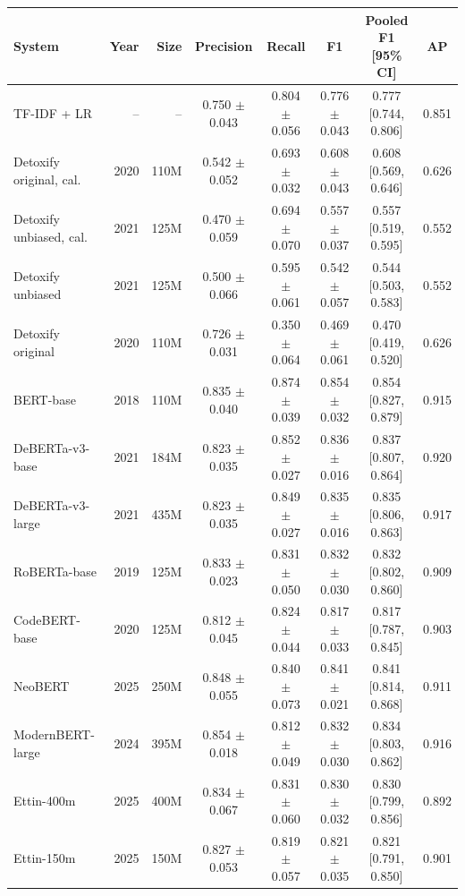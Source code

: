 \begin{tabular}{lrrccccc}
\toprule
System & Year & Size & Precision & Recall & F1 & Pooled F1 [95\% CI] & AP \\
\midrule
TF-IDF + LR & -- & -- & 0.750 $\pm$ 0.043 & 0.804 $\pm$ 0.056 & 0.776 $\pm$ 0.043 & 0.777 [0.744, 0.806] & 0.851 \\
\midrule
Detoxify original, cal. & 2020 & 110M & 0.542 $\pm$ 0.052 & 0.693 $\pm$ 0.032 & 0.608 $\pm$ 0.043 & 0.608 [0.569, 0.646] & 0.626 \\
Detoxify unbiased, cal. & 2021 & 125M & 0.470 $\pm$ 0.059 & 0.694 $\pm$ 0.070 & 0.557 $\pm$ 0.037 & 0.557 [0.519, 0.595] & 0.552 \\
Detoxify unbiased & 2021 & 125M & 0.500 $\pm$ 0.066 & 0.595 $\pm$ 0.061 & 0.542 $\pm$ 0.057 & 0.544 [0.503, 0.583] & 0.552 \\
Detoxify original & 2020 & 110M & 0.726 $\pm$ 0.031 & 0.350 $\pm$ 0.064 & 0.469 $\pm$ 0.061 & 0.470 [0.419, 0.520] & 0.626 \\
\midrule
BERT-base & 2018 & 110M & 0.835 $\pm$ 0.040 & 0.874 $\pm$ 0.039 & 0.854 $\pm$ 0.032 & 0.854 [0.827, 0.879] & 0.915 \\
DeBERTa-v3-base & 2021 & 184M & 0.823 $\pm$ 0.035 & 0.852 $\pm$ 0.027 & 0.836 $\pm$ 0.016 & 0.837 [0.807, 0.864] & 0.920 \\
DeBERTa-v3-large & 2021 & 435M & 0.823 $\pm$ 0.035 & 0.849 $\pm$ 0.027 & 0.835 $\pm$ 0.016 & 0.835 [0.806, 0.863] & 0.917 \\
RoBERTa-base & 2019 & 125M & 0.833 $\pm$ 0.023 & 0.831 $\pm$ 0.050 & 0.832 $\pm$ 0.030 & 0.832 [0.802, 0.860] & 0.909 \\
CodeBERT-base & 2020 & 125M & 0.812 $\pm$ 0.045 & 0.824 $\pm$ 0.044 & 0.817 $\pm$ 0.033 & 0.817 [0.787, 0.845] & 0.903 \\
\midrule
NeoBERT & 2025 & 250M & 0.848 $\pm$ 0.055 & 0.840 $\pm$ 0.073 & 0.841 $\pm$ 0.021 & 0.841 [0.814, 0.868] & 0.911 \\
ModernBERT-large & 2024 & 395M & 0.854 $\pm$ 0.018 & 0.812 $\pm$ 0.049 & 0.832 $\pm$ 0.030 & 0.834 [0.803, 0.862] & 0.916 \\
Ettin-400m & 2025 & 400M & 0.834 $\pm$ 0.067 & 0.831 $\pm$ 0.060 & 0.830 $\pm$ 0.032 & 0.830 [0.799, 0.856] & 0.892 \\
Ettin-150m & 2025 & 150M & 0.827 $\pm$ 0.053 & 0.819 $\pm$ 0.057 & 0.821 $\pm$ 0.035 & 0.821 [0.791, 0.850] & 0.901 \\

\end{tabular}
